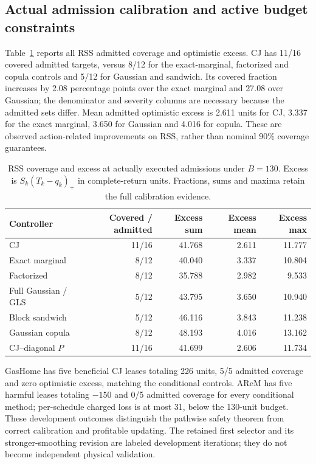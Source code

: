 \documentclass[10pt]{article}
\begin{document}
\subsection{Actual admission calibration and active budget constraints}
Table~\ref{tab:conditional-admission-calibration} reports all RSS admitted
coverage and optimistic excess. CJ has 11/16 covered admitted targets,
versus 8/12 for the exact-marginal, factorized and copula controls and
5/12 for Gaussian and sandwich. Its covered fraction increases by
2.08 percentage points over the exact marginal and 27.08 over Gaussian;
the denominator and severity columns are necessary because the admitted
sets differ. Mean admitted optimistic excess is 2.611 units for CJ,
3.337 for the exact marginal, 3.650 for Gaussian and 4.016 for copula.
These are observed action-related improvements on RSS, rather than
nominal 90\% coverage guarantees.

\begin{table}[t]
\centering\small
\caption{RSS coverage and excess at actually executed admissions under
$B=130$. Excess is $S_k(T_k-q_k)_+$ in complete-return units. Fractions,
sums and maxima retain the full calibration evidence.}
\label{tab:conditional-admission-calibration}
\begin{tabular}{lrrrr}
\toprule
Controller & Covered / admitted & Excess sum & Excess mean & Excess max\\
\midrule
CJ & 11/16 & 41.768 & 2.611 & 11.777\\
Exact marginal & 8/12 & 40.040 & 3.337 & 10.804\\
Factorized & 8/12 & 35.788 & 2.982 & 9.533\\
Full Gaussian / GLS & 5/12 & 43.795 & 3.650 & 10.940\\
Block sandwich & 5/12 & 46.116 & 3.843 & 11.238\\
Gaussian copula & 8/12 & 48.193 & 4.016 & 13.162\\
CJ--diagonal $P$ & 11/16 & 41.699 & 2.606 & 11.734\\
\bottomrule
\end{tabular}
\end{table}

GasHome has five beneficial CJ leases totaling 226 units, 5/5 admitted
coverage and zero optimistic excess, matching the conditional controls.
AReM has five harmful leases totaling $-150$ and 0/5 admitted coverage
for every conditional method; per-schedule charged loss is at most 31,
below the 130-unit budget. These development outcomes distinguish the
pathwise safety theorem from correct calibration and profitable updating.
The retained first selector and its stronger-smoothing revision are labeled
development iterations; they do not become independent physical validation.
\end{document}
